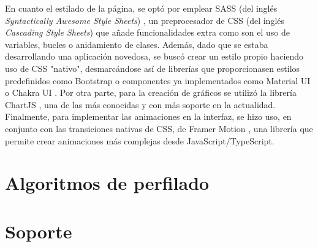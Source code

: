 \bigskip
En cuanto el estilado de la página, se optó por emplear SASS (del inglés \textit{Syntactically Awesome Style Sheets}) \cite{sass}, un preprocesador de CSS (del inglés \textit{Cascading Style Sheets}) que añade
funcionalidades extra como son el uso de variables, bucles o anidamiento de clases. Además, dado que se estaba desarrollando
una aplicación novedosa, se buscó crear un estilo propio haciendo uso de CSS "nativo", desmarcándose así de librerías que proporcionasen estilos predefinidos como Bootstrap \cite{bootstrap} o componentes ya implementados
como Material UI \cite{materialui} o Chakra UI \cite{chakraui}. Por otra parte, para la creación de gráficos se utilizó la librería ChartJS \cite{chartjs}, una de las más conocidas
y con más soporte en la actualidad. Finalmente, para implementar las animaciones en la interfaz, se hizo uso, en conjunto con las transiciones nativas
de CSS, de Framer Motion \cite{framermotion}, una librería que permite crear animaciones más complejas desde JavaScript/TypeScript. 

\section{Algoritmos de perfilado}
\label{sec:herramientas_algoritmos}

\section{Soporte}
